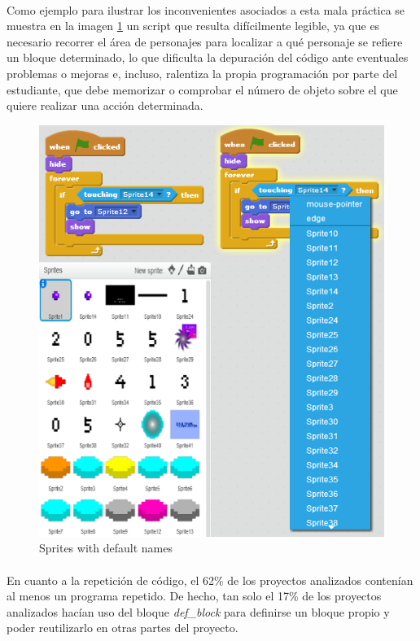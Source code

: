 \documentclass[a4paper,10pt]{article}
\begin{document}
\paragraph{}Como ejemplo para ilustrar los inconvenientes asociados a esta mala práctica se muestra en la imagen \ref{fig:SpriteNaming} un script que resulta difícilmente legible, ya que es necesario recorrer el área de personajes para localizar a qué personaje se refiere un bloque determinado, lo que dificulta la depuración del código ante eventuales problemas o mejoras e, incluso, ralentiza la propia programación por parte del estudiante, que debe memorizar o comprobar el número de objeto sobre el que quiere realizar una acción determinada.
\begin{figure}
  \centering
    \includegraphics{img/SpriteNaming.png}
  \caption{Sprites with default names}
  \label{fig:SpriteNaming}
\end{figure}
\paragraph{}En cuanto a la repetición de código, el 62\% de los proyectos analizados contenían al menos un programa repetido. De hecho, tan solo el 17\% de los proyectos analizados hacían uso del bloque \textit{def\_block} para definirse un bloque propio y poder reutilizarlo en otras partes del proyecto.
\end{document}
